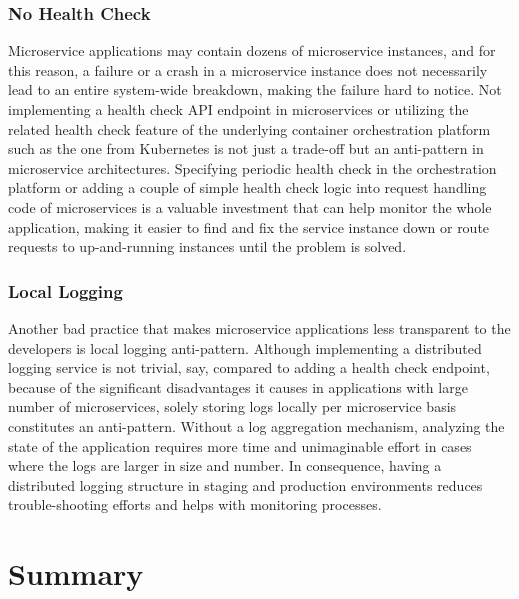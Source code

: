 \documentclass{Configuration_Files/PoliMi3i_thesis}
\begin{document}
\subsubsection{No Health Check}
\label{subsubsec:no_health_check}

Microservice applications may contain dozens of microservice instances, and for this reason, a failure or a crash in a microservice instance does not necessarily lead to an entire system-wide breakdown, making the failure hard to notice.
Not implementing a health check API endpoint in microservices or utilizing the related health check feature of the underlying container orchestration platform such as the one from Kubernetes is not just a trade-off but an anti-pattern in microservice architectures.
Specifying periodic health check in the orchestration platform or adding a couple of simple health check logic into request handling code of microservices is a valuable investment that can help monitor the whole application, making it easier to find and fix the service instance down or route requests to up-and-running instances until the problem is solved.

\subsubsection{Local Logging}
\label{subsubsec:local_logging}

Another bad practice that makes microservice applications less transparent to the developers is local logging anti-pattern.
Although implementing a distributed logging service is not trivial, say, compared to adding a health check endpoint, because of the significant disadvantages it causes in applications with large number of microservices, solely storing logs locally per microservice basis constitutes an anti-pattern.
Without a log aggregation mechanism, analyzing the state of the application requires more time and unimaginable effort in cases where the logs are larger in size and number.
In consequence, having a distributed logging structure in staging and production environments reduces trouble-shooting efforts and helps with monitoring processes.

\section{Summary}
\label{sec:state_of_the_art_summary}
\end{document}
